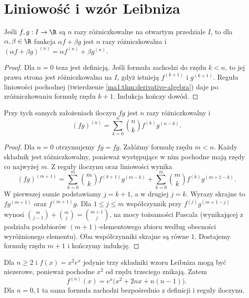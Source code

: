 \section{Liniowość i wzór Leibniza}
\begin{twierdzenie}
\label{ma1:thm:higher-linearity}
Jeśli $f,g:I\to\R$ są $n$ razy różniczkowalne na otwartym przedziale $I$, to dla $\alpha,\beta\in\R$ funkcja $\alpha f+\beta g$ jest $n$ razy różniczkowalna i
$(\alpha f+\beta g)^{(n)}=\alpha f^{(n)}+\beta g^{(n)}$.
\end{twierdzenie}
\begin{proof}
Dla $n=0$ teza jest definicją. Jeśli formuła zachodzi do rzędu $k<n$, to jej prawa strona jest różniczkowalna na $I$, gdyż istnieją $f^{(k+1)}$ i $g^{(k+1)}$. Reguła liniowości pochodnej (twierdzenie \ref{ma1:thm:derivative-algebra}) daje po zróżniczkowaniu formułę rzędu $k+1$. Indukcja kończy dowód.
\end{proof}

\begin{twierdzenie}
\label{ma1:thm:leibniz}
Przy tych samych założeniach iloczyn $fg$ jest $n$ razy różniczkowalny i
\[
 (fg)^{(n)}=\sum_{k=0}^n \binom nk f^{(k)}g^{(n-k)}.
\]
\end{twierdzenie}
\begin{proof}
Dla $n=0$ otrzymujemy $fg=fg$. Załóżmy formułę rzędu $m<n$. Każdy składnik jest różniczkowalny, ponieważ występujące w nim pochodne mają rzędy co najwyżej $m$. Z reguły iloczynu oraz liniowości wynika
\[
 (fg)^{(m+1)}
 =\sum_{k=0}^m\binom mk f^{(k+1)}g^{(m-k)}
 +\sum_{k=0}^m\binom mk f^{(k)}g^{(m+1-k)}.
\]
W pierwszej sumie podstawiamy $j=k+1$, a w drugiej $j=k$. Wyrazy skrajne to $fg^{(m+1)}$ oraz $f^{(m+1)}g$. Dla $1\le j\le m$ współczynnik przy $f^{(j)}g^{(m+1-j)}$ wynosi $\binom m{j-1}+\binom mj=\binom{m+1}j$, na mocy tożsamości Pascala (wynikającej z podziału podzbiorów $(m+1)$-elementowego zbioru według obecności wyróżnionego elementu). Oba współczynniki skrajne są równe $1$. Dostajemy formułę rzędu $m+1$ i kończymy indukcję.
\end{proof}
\begin{przyklad}
\label{ma1:ex:leibniz-polynomial-exp}
Dla $n\ge2$ i $f(x)=x^2e^x$ jedynie trzy składniki wzoru Leibniza mogą być niezerowe, ponieważ pochodne $x^2$ od rzędu trzeciego znikają. Zatem
\[
 f^{(n)}(x)=e^x\bigl(x^2+2nx+n(n-1)\bigr).
\]
Dla $n=0,1$ ta sama formuła zachodzi bezpośrednio z definicji i reguły iloczynu.
\end{przyklad}

